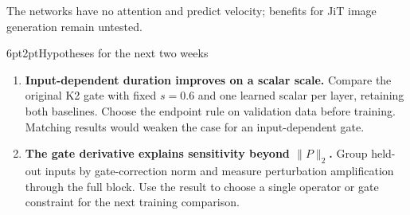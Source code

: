 \documentclass[11pt]{article}
\makeatletter
\renewcommand\section{\@startsection{section}{1}{\z@}%
 {6pt\@plus2pt\@minus2pt}{2pt}{\normalfont\large\bfseries}}
\newcommand{\norm}[1]{\lVert#1\rVert}
\makeatother
\begin{document}
The networks have no attention and predict velocity; benefits for JiT image
generation remain untested.

\section{Hypotheses for the next two weeks}
\begin{enumerate}
\item \textbf{Input-dependent duration improves on a scalar scale.} Compare the
original K2 gate with fixed $s=0.6$ and one learned scalar per layer, retaining both
baselines. Choose the endpoint rule on validation data before training.
Matching results would weaken the case for an input-dependent gate.
\item \textbf{The gate derivative explains sensitivity beyond $\norm{P}_2$.}
Group held-out inputs by gate-correction norm and measure perturbation
amplification through the full block. Use the result to choose a single operator
or gate constraint for the next training comparison.
\end{enumerate}
\end{document}
